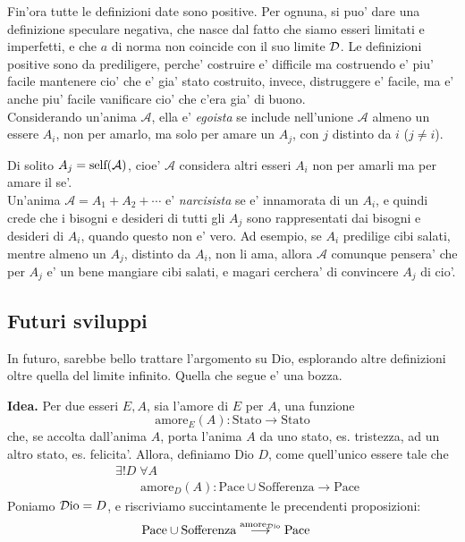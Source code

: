 Fin'ora tutte le definizioni date sono positive. Per ognuna, si puo' dare una definizione speculare negativa, che nasce dal fatto che siamo esseri limitati e imperfetti, e che $a$ di norma non coincide con il suo limite $\mathcal{D}$. Le definizioni positive sono da prediligere, perche' costruire e' difficile ma costruendo e' piu' facile mantenere cio' che e' gia' stato costruito, invece, distruggere e' facile, ma e' anche piu' facile vanificare cio' che c'era gia' di buono.\\

Considerando un'anima $\mathcal{A}$, ella e' \emph{egoista} se include nell'unione $\mathcal{A}$ almeno un essere $A_i$, non per amarlo, ma solo per amare un $A_j$, con $j$ distinto da $i$ ($j\ne i$).

Di solito $A_j = \textrm{self}(\mathcal{A})$, cioe' $\mathcal{A}$ considera altri esseri $A_i$ non per amarli ma per amare il se'.\\

Un'anima $\mathcal{A}=A_1+A_2+\cdots$ e' \emph{narcisista} se e' innamorata di un $A_i$, e quindi crede che i bisogni e desideri di tutti gli $A_j$ sono rappresentati dai bisogni e desideri di $A_i$, quando questo non e' vero. Ad esempio, se $A_i$ predilige cibi salati, mentre almeno un $A_j$, distinto da $A_i$, non li ama, allora $\mathcal{A}$ comunque pensera' che per $A_j$ e' un bene mangiare cibi salati, e magari cerchera' di convincere $A_j$ di cio'.


\subsection{Futuri sviluppi}
\label{FuturiSviluppiProcAssiomatico}
In futuro, sarebbe bello trattare l'argomento su Dio, esplorando altre definizioni oltre quella del limite infinito.
Quella che segue e' una bozza.

	\textbf{Idea. } Per due esseri $E,A$, sia l'amore di $E$ per $A$, una funzione 
    \[\textrm{amore}_E(A):\textrm{Stato}\longrightarrow\textrm{Stato}\]
    che, se accolta dall'anima $A$, porta l'anima $A$ da uno stato, es. tristezza, ad un altro stato, es. felicita'. Allora, definiamo Dio $D$, come quell'unico essere tale che
    \begin{align}
        &\exists ! D \;\forall A \;\;\nonumber\\
        &\qquad\textrm{amore}_D(A): \textrm{Pace}\cup\textrm{Sofferenza} \longrightarrow \textrm{Pace}
    \end{align}
    Poniamo $\mathcal{D}\textrm{io}=D$, e riscriviamo succintamente le precendenti proposizioni:
    \begin{align*}
        &\textrm{Pace}\cup\textrm{Sofferenza} \stackrel{\textrm{amore}_{\mathcal{D}\textrm{io}}}{\longrightarrow} \textrm{Pace}
    \end{align*}

